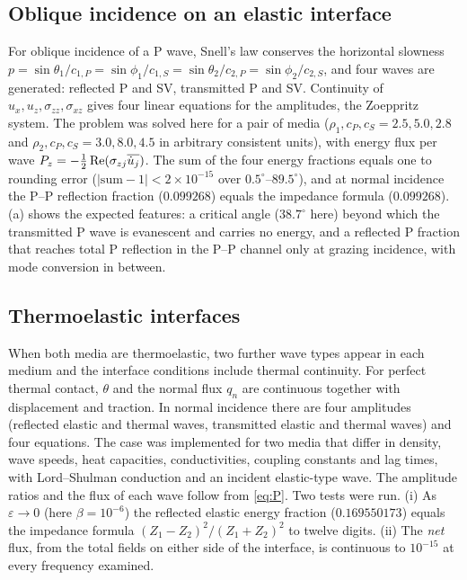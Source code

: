 \subsection{Oblique incidence on an elastic interface}
For oblique incidence of a P wave, Snell's law conserves the horizontal slowness $p=\sin\theta_1/c_{1,P}=\sin\phi_1/c_{1,S}=\sin\theta_2/c_{2,P}=\sin\phi_2/c_{2,S}$, and four waves are generated: reflected P and SV, transmitted P and SV. Continuity of $u_x,u_z,\sigma_{zz},\sigma_{xz}$ gives four linear equations for the amplitudes, the Zoeppritz system. The problem was solved here for a pair of media ($\rho_1,c_P,c_S=2.5,5.0,2.8$ and $\rho_2,c_P,c_S=3.0,8.0,4.5$ in arbitrary consistent units), with energy flux per wave $P_z=-\tfrac12\operatorname{Re}(\sigma_{zj}\overline{\dot u_j})$. The sum of the four energy fractions equals one to rounding error ($|\text{sum}-1|<2\times10^{-15}$ over $0.5^\circ$--$89.5^\circ$), and at normal incidence the P--P reflection fraction ($0.099268$) equals the impedance formula ($0.099268$). (a) shows the expected features: a critical angle ($38.7^\circ$ here) beyond which the transmitted P wave is evanescent and carries no energy, and a reflected P fraction that reaches total P reflection in the P--P channel only at grazing incidence, with mode conversion in between.

\subsection{Thermoelastic interfaces}
When both media are thermoelastic, two further wave types appear in each medium and the interface conditions include thermal continuity. For perfect thermal contact, $\theta$ and the normal flux $q_n$ are continuous together with displacement and traction. In normal incidence there are four amplitudes (reflected elastic and thermal waves, transmitted elastic and thermal waves) and four equations. The case was implemented for two media that differ in density, wave speeds, heat capacities, conductivities, coupling constants and lag times, with Lord--Shulman conduction and an incident elastic-type wave. The amplitude ratios and the flux of each wave follow from \eqref{eq:P}. Two tests were run. (i) As $\varepsilon\to0$ (here $\beta=10^{-6}$) the reflected elastic energy fraction ($0.169550173$) equals the impedance formula $(Z_1-Z_2)^2/(Z_1+Z_2)^2$ to twelve digits. (ii) The \emph{net} flux, from the total fields on either side of the interface, is continuous to $10^{-15}$ at every frequency examined.

